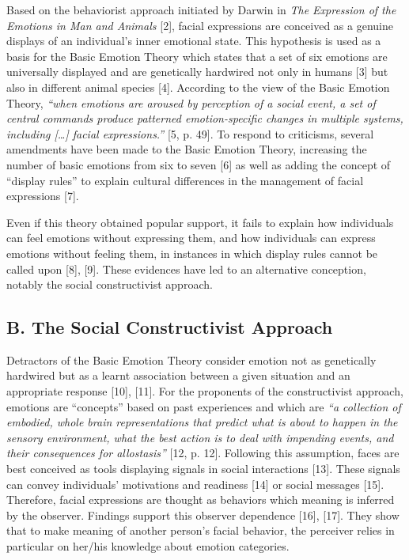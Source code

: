 \documentclass[conference,final,]{IEEEtran}
\begin{document}
Based on the behaviorist approach initiated by Darwin in \emph{The
Expression of the Emotions in Man and Animals} {[}2{]}, facial
expressions are conceived as a genuine displays of an individual's inner
emotional state. This hypothesis is used as a basis for the Basic
Emotion Theory which states that a set of six emotions are universally
displayed and are genetically hardwired not only in humans {[}3{]} but
also in different animal species {[}4{]}. According to the view of the
Basic Emotion Theory, \emph{``when emotions are aroused by perception of
a social event, a set of central commands produce patterned
emotion-specific changes in multiple systems, including {[}\ldots{}{]}
facial expressions.''} {[}5, p. 49{]}. To respond to criticisms, several
amendments have been made to the Basic Emotion Theory, increasing the
number of basic emotions from six to seven {[}6{]} as well as adding the
concept of ``display rules'' to explain cultural differences in the
management of facial \linebreak expressions {[}7{]}.

Even if this theory obtained popular support, it fails to explain how
individuals can feel emotions without expressing them, and how
individuals can express emotions without feeling them, in instances in
which display rules cannot be called upon {[}8{]}, {[}9{]}. These
evidences have led to an alternative conception, notably the social
constructivist approach.

\hypertarget{b.-the-social-constructivist-approach}{%
\subsection{B. The Social Constructivist
Approach}\label{b.-the-social-constructivist-approach}}

Detractors of the Basic Emotion Theory consider emotion not as
genetically hardwired but as a learnt association between a given
situation and an appropriate response {[}10{]}, {[}11{]}. For the
proponents of the constructivist approach, emotions are ``concepts''
based on past experiences and which are \emph{``a collection of
embodied, whole brain representations that predict what is about to
happen in the sensory environment, what the best action is to deal with
impending events, and their consequences for allostasis''} {[}12, p.
12{]}. Following this assumption, faces are best conceived as tools
displaying signals in social interactions {[}13{]}. These signals can
convey individuals' motivations and readiness {[}14{]} or social
messages {[}15{]}. Therefore, facial expressions are thought as
behaviors which meaning is inferred by the observer. Findings support
this observer dependence {[}16{]}, {[}17{]}. They show that to make
meaning of another person's facial behavior, the perceiver relies in
particular on her/his knowledge about emotion categories.
\end{document}
